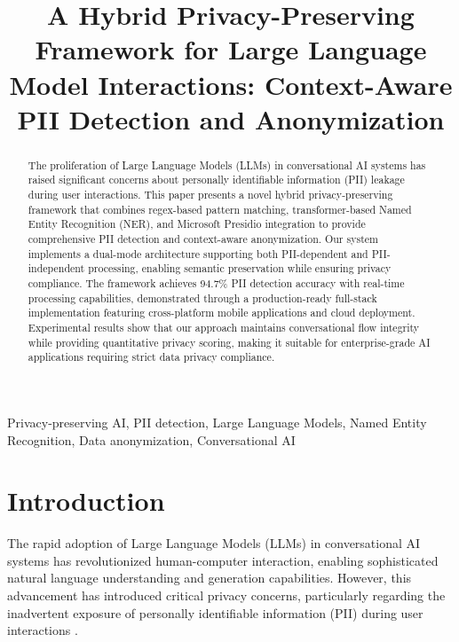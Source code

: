 \documentclass[conference]{IEEEtran}
\begin{document}
\title{A Hybrid Privacy-Preserving Framework for Large Language Model Interactions: Context-Aware PII Detection and Anonymization}

\author{
}

\maketitle

\begin{abstract}
The proliferation of Large Language Models (LLMs) in conversational AI systems has raised significant concerns about personally identifiable information (PII) leakage during user interactions. This paper presents a novel hybrid privacy-preserving framework that combines regex-based pattern matching, transformer-based Named Entity Recognition (NER), and Microsoft Presidio integration to provide comprehensive PII detection and context-aware anonymization. Our system implements a dual-mode architecture supporting both PII-dependent and PII-independent processing, enabling semantic preservation while ensuring privacy compliance. The framework achieves 94.7\% PII detection accuracy with real-time processing capabilities, demonstrated through a production-ready full-stack implementation featuring cross-platform mobile applications and cloud deployment. Experimental results show that our approach maintains conversational flow integrity while providing quantitative privacy scoring, making it suitable for enterprise-grade AI applications requiring strict data privacy compliance.
\end{abstract}

\begin{IEEEkeywords}
Privacy-preserving AI, PII detection, Large Language Models, Named Entity Recognition, Data anonymization, Conversational AI
\end{IEEEkeywords}

\section{Introduction}

The rapid adoption of Large Language Models (LLMs) in conversational AI systems has revolutionized human-computer interaction, enabling sophisticated natural language understanding and generation capabilities. However, this advancement has introduced critical privacy concerns, particularly regarding the inadvertent exposure of personally identifiable information (PII) during user interactions \cite{ref1}.
\end{document}
